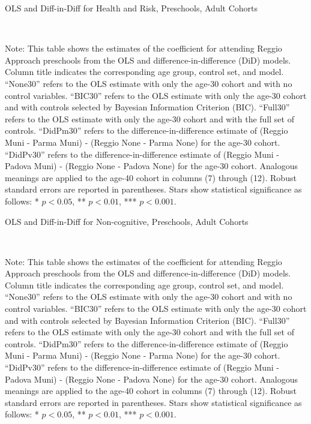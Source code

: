 \documentclass[12pt]{article}
\begin{document}
\begin{landscape}
\begin{table}[H] \caption{OLS and Diff-in-Diff for Health and Risk, Preschools, Adult Cohorts} \label{ols-H-reg}
\scalebox{0.77}{
}
\vspace{1ex} \\
\footnotesize\raggedright{Note: This table shows the estimates of the coefficient for attending Reggio Approach preschools from the OLS and difference-in-difference (DiD) models. Column title indicates the corresponding age group, control set, and model. ``None30'' refers to the OLS estimate with only the age-30 cohort and with no control variables. ``BIC30'' refers to the OLS estimate with only the age-30 cohort and with controls selected by Bayesian Information Criterion (BIC). ``Full30'' refers to the OLS estimate with only the age-30 cohort and with the full set of controls. ``DidPm30'' refers to the difference-in-difference estimate of (Reggio Muni - Parma Muni) - (Reggio None - Parma None) for the age-30 cohort. ``DidPv30'' refers to the difference-in-difference estimate of (Reggio Muni - Padova Muni) - (Reggio None - Padova None) for the age-30 cohort.  Analogous meanings are applied to the age-40 cohort in columns (7) through (12). Robust standard errors are reported in parentheses. Stars show statistical significance as follows: * $p < 0.05$, ** $p < 0.01$, *** $p < 0.001$.}
\end{table}

\begin{table}[H] \caption{OLS and Diff-in-Diff for Non-cognitive, Preschools, Adult Cohorts} \label{ols-N-reg}
\scalebox{0.80}{
}
\vspace{1ex} \\
\footnotesize\raggedright{Note: This table shows the estimates of the coefficient for attending Reggio Approach preschools from the OLS and difference-in-difference (DiD) models. Column title indicates the corresponding age group, control set, and model. ``None30'' refers to the OLS estimate with only the age-30 cohort and with no control variables. ``BIC30'' refers to the OLS estimate with only the age-30 cohort and with controls selected by Bayesian Information Criterion (BIC). ``Full30'' refers to the OLS estimate with only the age-30 cohort and with the full set of controls. ``DidPm30'' refers to the difference-in-difference estimate of (Reggio Muni - Parma Muni) - (Reggio None - Parma None) for the age-30 cohort. ``DidPv30'' refers to the difference-in-difference estimate of (Reggio Muni - Padova Muni) - (Reggio None - Padova None) for the age-30 cohort.  Analogous meanings are applied to the age-40 cohort in columns (7) through (12). Robust standard errors are reported in parentheses. Stars show statistical significance as follows: * $p < 0.05$, ** $p < 0.01$, *** $p < 0.001$.}
\end{table}


\end{landscape}
\end{document}
